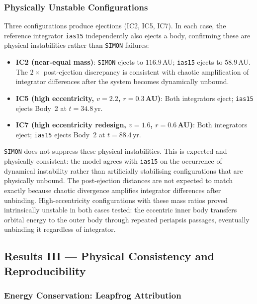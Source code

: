 \documentclass[12pt]{article}
\begin{document}
\subsubsection{Physically Unstable Configurations}
\label{sec:unstable_ics}

Three configurations produce ejections (IC2, IC5, IC7). In each case, the reference
integrator \texttt{ias15} independently also ejects a body, confirming these are
physical instabilities rather than \texttt{SIMON} failures:

\begin{itemize}
  \item \textbf{IC2 (near-equal mass)}: \texttt{SIMON} ejects to $116.9$\,AU;
        \texttt{ias15} ejects to $58.9$\,AU. The $2\times$ post-ejection discrepancy
        is consistent with chaotic amplification of integrator differences after the
        system becomes dynamically unbound.
  \item \textbf{IC5 (high eccentricity, $v = 2.2$, $r = 0.3$\,AU)}: Both
        integrators eject; \texttt{ias15} ejects Body~2 at $t = 34.8$\,yr.
  \item \textbf{IC7 (high eccentricity redesign, $v = 1.6$, $r = 0.6$\,AU)}:
        Both integrators eject; \texttt{ias15} ejects Body~2 at $t = 88.4$\,yr.
\end{itemize}

\texttt{SIMON} does not suppress these physical instabilities. This is expected and physically consistent: the model agrees with \texttt{ias15} on the occurrence of dynamical instability rather than artificially stabilising configurations that
are physically unbound. The post-ejection distances are not expected to match exactly
because chaotic divergence amplifies integrator differences after unbinding. High-eccentricity
configurations with these mass ratios proved intrinsically unstable in both cases
tested: the eccentric inner body transfers orbital energy to the outer body through
repeated periapsis passages, eventually unbinding it regardless of integrator.


\subsection{Results III --- Physical Consistency and Reproducibility}
\label{sec:physical}

\subsubsection{Energy Conservation: Leapfrog Attribution}
\label{sec:energy}
\end{document}
